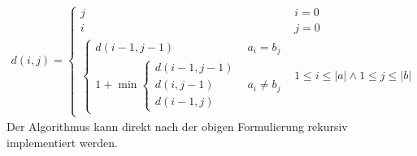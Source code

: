 \documentclass{whswinvcbook}
\begin{document}
\begin{align}
    d(i,j)=\begin{cases}
        j & i=0\\
        i & j=0\\
        \begin{cases}
            d(i-1,j-1) & a_i=b_j\\
            1+\min\begin{cases}
                d(i-1,j-1)\\
                d(i,j-1)\\
                d(i-1,j)
            \end{cases} & a_i\neq b_j
        \end{cases} & 1\leq i\leq |a| \wedge 1\leq j\leq |b|
    \end{cases}
\end{align}
Der Algorithmus kann direkt nach der obigen Formulierung rekursiv implementiert werden.
\end{document}
